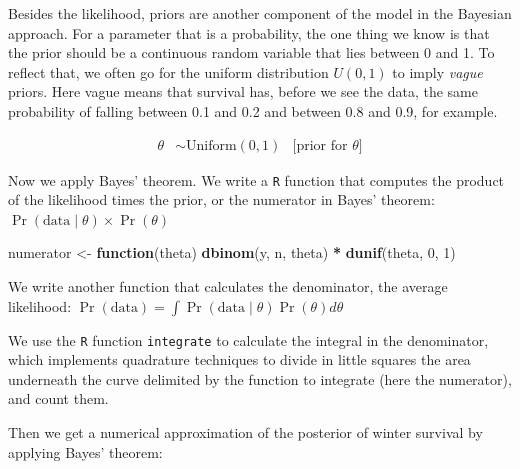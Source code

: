 \documentclass[
  12pt,
]{krantz}
\newenvironment{Shaded}{\begin{snugshade}}{\end{snugshade}}
\newcommand{\ControlFlowTok}[1]{\textcolor[rgb]{0.13,0.29,0.53}{\textbf{#1}}}
\newcommand{\DecValTok}[1]{\textcolor[rgb]{0.00,0.00,0.81}{#1}}
\newcommand{\FunctionTok}[1]{\textcolor[rgb]{0.13,0.29,0.53}{\textbf{#1}}}
\newcommand{\NormalTok}[1]{#1}
\newcommand{\OtherTok}[1]{\textcolor[rgb]{0.56,0.35,0.01}{#1}}
\newcommand{\SpecialCharTok}[1]{\textcolor[rgb]{0.81,0.36,0.00}{\textbf{#1}}}
\begin{document}
Besides the likelihood, priors are another component of the model in the Bayesian approach. For a parameter that is a probability, the one thing we know is that the prior should be a continuous random variable that lies between 0 and 1. To reflect that, we often go for the uniform distribution \(U(0,1)\) to imply \emph{vague} priors. Here vague means that survival has, before we see the data, the same probability of falling between 0.1 and 0.2 and between 0.8 and 0.9, for example.

\begin{align*}
\theta &\sim \text{Uniform}(0, 1) &\text{[prior for }\theta \text{]}
\end{align*}

Now we apply Bayes' theorem. We write a \texttt{R} function that computes the product of the likelihood times the prior, or the numerator in Bayes' theorem: \(\Pr(\text{data} \mid \theta) \times \Pr(\theta)\)

\begin{Shaded}
\begin{Highlighting}[]
\NormalTok{numerator }\OtherTok{\textless{}{-}} \ControlFlowTok{function}\NormalTok{(theta) }\FunctionTok{dbinom}\NormalTok{(y, n, theta) }\SpecialCharTok{*} \FunctionTok{dunif}\NormalTok{(theta, }\DecValTok{0}\NormalTok{, }\DecValTok{1}\NormalTok{)}
\end{Highlighting}
\end{Shaded}

We write another function that calculates the denominator, the average likelihood: \(\Pr(\text{data}) = \int{\Pr(\text{data} \mid \theta) \Pr(\theta) d\theta}\)

\begin{Shaded}
\end{Shaded}

We use the \texttt{R} function \texttt{integrate} to calculate the integral in the denominator, which implements quadrature techniques to divide in little squares the area underneath the curve delimited by the function to integrate (here the numerator), and count them.

Then we get a numerical approximation of the posterior of winter survival by applying Bayes' theorem:
\end{document}
